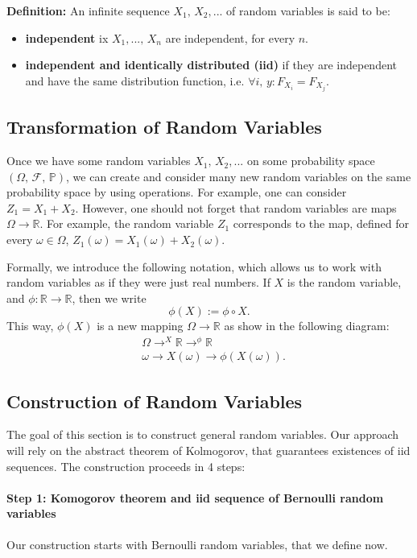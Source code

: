 \documentclass[a4paper]{extarticle}
\begin{document}
\textbf{Definition:} An infinite sequence \(X_1, \, X_2,...\) of random variables is said to be:

\begin{itemize}
    \item \textbf{independent} ix \(X_1,..., \, X_n\) are independent, for every \(n\).
    \item \textbf{independent and identically distributed (iid)} if they are independent and have the same distribution function, i.e. \(\forall i, \, y : F_{X_i} = F_{X_j}\).
\end{itemize}

\subsection{Transformation of Random Variables}

Once we have some random variables \(X_1, \, X_2,...\) on some probability space \((\Omega, \, \mathcal{F}, \, \mathbb{P})\), we can create and consider many new random variables on the same probability space by using operations. For example, one can consider \(Z_1 = X_1 + X_2\). However, one should not forget that random variables are maps \(\Omega \to \mathbb{R}\). For example, the random variable \(Z_1\) corresponds to the map, defined for every \(\omega \in \Omega\), \(Z_1(\omega) = X_1(\omega) + X_2(\omega)\).

Formally, we introduce the following notation, which allows us to work with random variables as if they were just real numbers. If \(X\) is the random variable, and \(\phi : \mathbb{R} \to \mathbb{R}\), then we write
\[
    \phi(X) := \phi \circ X.
\]
This way, \(\phi(X)\) is a new mapping \(\Omega \to \mathbb{R}\) as show in the following diagram:
\begin{align*}
    &\Omega \to^{X} \mathbb{R} \to^{\phi} \mathbb{R} \\
    &\omega \to X(\omega) \to \phi(X(\omega)).
\end{align*}

\subsection{Construction of Random Variables}

The goal of this section is to construct general random variables. Our approach will rely on the abstract theorem of Kolmogorov, that guarantees existences of iid sequences. The construction proceeds in 4 steps:

\paragraph{Step 1: Komogorov theorem and iid sequence of Bernoulli random variables}
Our construction starts with Bernoulli random variables, that we define now.
\end{document}
